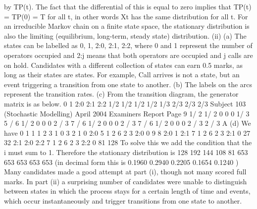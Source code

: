 by TP(t).
The fact that the differential of this is equal to zero implies that TP(t)
= TP(0) = T for all t, in other words Xt has the same distribution for
all t.
For an irreducible Markov chain on a finite state space, the stationary
distribution is also the limiting (equilibrium, long-term, steady state)
distribution.
(ii) (a) The states can be labelled as 0, 1, 2:0, 2:1, 2:2, where 0 and 1 represent
the number of operators occupied and 2:j means that both operators are
occupied and j calls are on hold.
Candidates with a different collection of states can earn 0.5 marks, as
long as their states are states. For example, Call arrives is not a
state, but an event triggering a transition from one state to another.
(b)
The labels on the arcs represent the transition rates.
(c) From the transition diagram, the generator matrix is as below.
0 1 2:0 2:1 2:2
1/2 1/2 1/2 1/2
1/3 2/3 2/3 2/3
Subject 103 (Stochastic Modelling) April 2004 Examiners Report
Page 9
1/ 2 1/ 2 0 0 0
1/ 3 5 / 6 1/ 2 0 0
0 2 / 3 7 / 6 1/ 2 0
0 0 2 / 3 7 / 6 1/ 2
0 0 0 2 / 3 2 / 3
A
(d) We have
0 1
1 1
2 3 1 0
3
2
1 0 2:0
5 1 2
6 2 3 2:0 0
9
8
2:0 1 2:1
7 1 2
6 2 3 2:1 0
27
32
2:1 2:0 2:2
7 1 2
6 2 3 2:2 0
81
128
To solve this we add the condition that the i must sum to 1.
Therefore the stationary distribution is
128 192 144 108 81
653 653 653 653 653
(in decimal form this is
0.1960 0.2940 0.2205 0.1654 0.1240 )
Many candidates made a good attempt at part (i), though not many scored full marks. In part
(ii) a surprising number of candidates were unable to distinguish between states in which
the process stays for a certain length of time and events, which occur instantaneously and
trigger transitions from one state to another.
